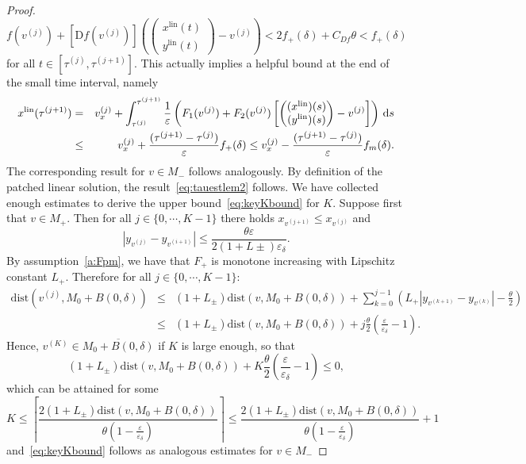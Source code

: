 \documentclass[12pt]{article}
\def\txtd{{\textnormal{d}}}
\newcommand{\be}{\begin{equation}}
\newcommand{\ee}{\end{equation}}
\newcommand{\bea}{\begin{eqnarray}}
\newcommand{\eea}{\end{eqnarray}}
\newcommand{\beann}{\begin{eqnarray*}}
\newcommand{\eeann}{\end{eqnarray*}}
\newcommand{\benn}{\begin{equation*}}
\newcommand{\eenn}{\end{equation*}}
\begin{document}
\begin{proof}
\be
f(v^{(j)}) + [\mathrm{D}f(v^{(j)})]\left(
\left(\begin{matrix}x^{\mathrm{lin}}(t)\\
y^{\mathrm{lin}}(t)\end{matrix}\right)
- v^{(j)}\right)  < 2f_+(\delta) + C_{Df}\theta < f_+(\delta)
\label{estimate_g_in_Mplus}
\ee
for all $t\in [\tau^{(j)},\tau^{(j+1)}]$. This actually implies a helpful
bound at the end of the small time interval, namely 
\bea
x^{\mathrm{lin}}(\tau^{(j+1)}) &=& v^{(j)}_x 
+ \int_{\tau^{(j)}}^{\tau^{(j+1)}} \frac{1}{\varepsilon}
\left(	F_1(v^{(j)}) + F_2(v^{(j)})\left[
\left(\begin{matrix}(x^{\mathrm{lin}})(s)\\(y^{\mathrm{lin}})(s)
\end{matrix}\right) - v^{(j)}\right]\right)\,\txtd s\nonumber\\
&\leq& v^{(j)}_x + \frac{(\tau^{(j+1)}-\tau^{(j)})}{\varepsilon}f_+(\delta)
\leq v^{(j)}_x - \frac{(\tau^{(j+1)}-\tau^{(j)})}{\varepsilon}f_m(\delta).
\label{order_convergence_ylin}
\eea
The corresponding result for $v\in M_-$ follows analogously.
By definition of the patched linear solution, the result~\eqref{eq:tauestlem2}
follows. We have collected enough estimates to derive the upper 
bound~\eqref{eq:keyKbound} for $K$. Suppose first that $v\in M_+$. Then for 
all $j\in \{0,\cdots, K-1\}$ there holds $x_{v^{(j+1)}} \leq x_{v^{(j)}}$ and 
\benn
\left|y_{v^{(j)}} - y_{v^{(i+1)}}\right| \leq  
\frac{\theta\varepsilon}{2(1+L\pm)\varepsilon_\delta}.
\eenn
By assumption~\ref{a:Fpm}, we have that $F_+$ is monotone increasing with 
Lipschitz constant $L_+$. Therefore
for all $j\in \{0,\cdots, K-1\}$:
\beann
\mathrm{dist}(v^{(j)}, M_0+B(0,\delta))
&\leq &(1+L_\pm)\mathrm{dist}(v, M_0+B(0,\delta)) + \sum_{k=0}^{j-1} 
\left(L_+|y_{v^{(k+1)}} - y_{v^{(k)}}| -\frac{\theta}{2}\right)\\
&\leq& (1+L_\pm)\mathrm{dist}(v, M_0+B(0,\delta)) + j\frac{\theta}{2}
\left(\frac{\varepsilon}{\varepsilon_\delta}-1\right).
\eeann
Hence, $v^{(K)}\in \overline{M_0+B(0,\delta)}$ if $K$ is large enough, 
so that
\benn
(1+L_\pm)\mathrm{dist}(v, M_0+B(0,\delta)) + K\frac{\theta}{2}
\left(\frac{\varepsilon}{\varepsilon_\delta}-1\right)\leq 0,
\eenn
which can be attained for some
\benn
K\leq  \left\lceil\frac{2(1+L_\pm)\mathrm{dist}(v, M_0+B(0,\delta))}{\theta
\left(1-\frac{\varepsilon}{\varepsilon_\delta}\right)}\right\rceil 
\leq \frac{2(1+L_\pm)\mathrm{dist}(v, M_0+B(0,\delta))}{\theta
\left(1-\frac{\varepsilon}{\varepsilon_\delta}\right)} + 1
\eenn
and~\eqref{eq:keyKbound} follows as analogous estimates for $v\in M_-$ 

\end{proof}
\end{document}
